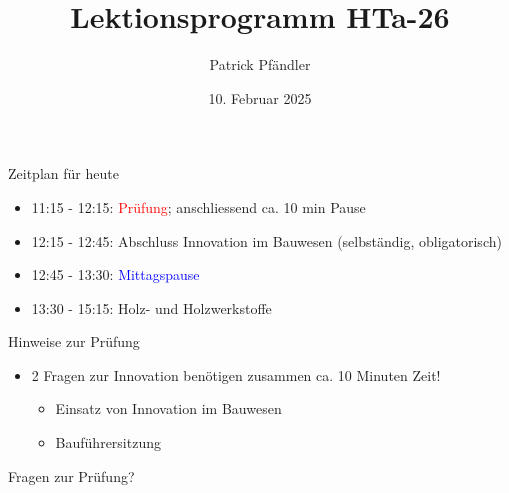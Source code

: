 

\def\customoptions{aspectratio=169} %



\title{\textbf{Lektionsprogramm HTa-26}}
\author{Patrick Pfändler}
\date{10. Februar 2025}



\frame{\titlepage}
\begin{frame}{Zeitplan für heute}
	\begin{itemize}
		\item[\textbullet] 11:15 - 12:15: \textcolor{red}{Prüfung}; anschliessend ca. 10 min Pause
		\item[\textbullet] 12:15 - 12:45: Abschluss Innovation im Bauwesen (selbständig, obligatorisch)
		\item[\textbullet] 12:45 - 13:30: \textcolor{blue}{Mittagspause}
		\item[\textbullet] 13:30 - 15:15: Holz- und Holzwerkstoffe
	\end{itemize}
\end{frame}




%
%

\begin{frame}{Hinweise zur Prüfung}
	\begin{itemize}
		\item [\textbullet] 2 Fragen zur Innovation benötigen zusammen ca. 10 Minuten Zeit!
		\begin{itemize}
			\item [\textbullet] Einsatz von Innovation im Bauwesen
			\item [\textbullet] Bauführersitzung
		\end{itemize}
	\end{itemize}

\end{frame}


\begin{frame}{Fragen zur Prüfung?}

\end{frame}






